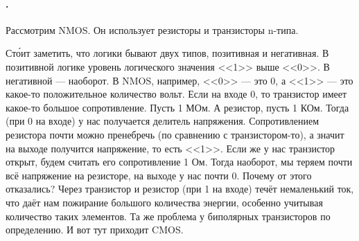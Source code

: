 \documentclass{article}
\begin{document}
    \paragraph{.}
    Рассмотрим NMOS. Он использует резисторы и транзисторы n-типа.
    \begin{center}
    \end{center}
    Ст\'{о}ит заметить, что логики бывают двух типов, позитивная и негативная. В позитивной логике уровень логического значения <<1>> выше <<0>>. В негативной --- наоборот. В NMOS, например, <<0>> --- это 0, а <<1>> --- это какое-то положительное количество вольт. Если на входе 0, то транзистор имеет какое-то большое сопротивление. Пусть 1 МОм. А резистор, пусть 1 КОм. Тогда (при 0 на входе) у нас получается делитель напряжения. Сопротивлением резистора почти можно пренебречь (по сравнению с транзистором-то), а значит на выходе получится напряжение, то есть <<1>>. Если же у нас транзистор открыт, будем считать его сопротивление 1 Ом. Тогда наоборот, мы теряем почти всё напряжение на резисторе, на выходе у нас почти 0. Почему от этого отказались? Через транзистор и резистор (при 1 на входе) течёт немаленький ток, что даёт нам пожирание большого количества энергии, особенно учитывая количество таких элементов. Та же проблема у биполярных транзисторов по определению. И вот тут приходит CMOS.
    \begin{center}
    \end{center}
\end{document}
